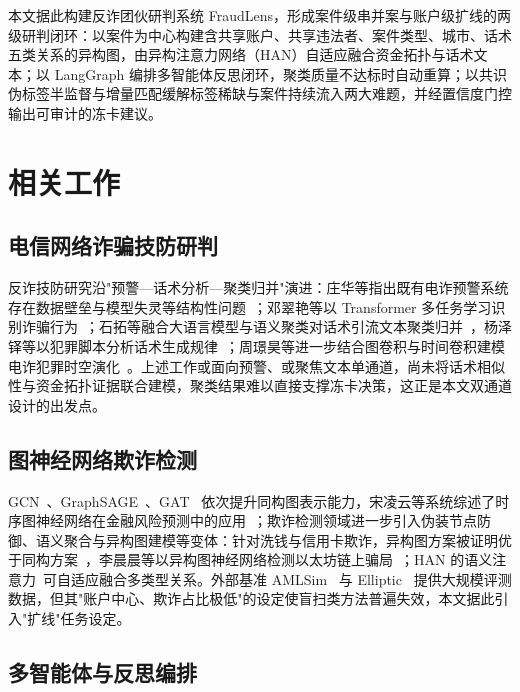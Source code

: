 \documentclass[12pt,a4paper,fontset=windows]{ctexart}
\begin{document}
本文据此构建反诈团伙研判系统 FraudLens，形成案件级串并案与账户级扩线的两级研判闭环：以案件为中心构建含共享账户、共享违法者、案件类型、城市、话术五类关系的异构图，由异构注意力网络（HAN）自适应融合资金拓扑与话术文本；以 LangGraph 编排多智能体反思闭环，聚类质量不达标时自动重算；以共识伪标签半监督与增量匹配缓解标签稀缺与案件持续流入两大难题，并经置信度门控输出可审计的冻卡建议。

\section{相关工作}

\subsection{电信网络诈骗技防研判}

反诈技防研究沿"预警—话术分析—聚类归并"演进：庄华等指出既有电诈预警系统存在数据壁垒与模型失灵等结构性问题~\cite{zhuang2025warning}；邓翠艳等以 Transformer 多任务学习识别诈骗行为~\cite{deng2024transformer}；石拓等融合大语言模型与语义聚类对话术引流文本聚类归并~\cite{shi2025llmsemantic}，杨泽铎等以犯罪脚本分析话术生成规律~\cite{yang2025crimescript}；周璟昊等进一步结合图卷积与时间卷积建模电诈犯罪时空演化~\cite{zhou2025spatiotemporal}。上述工作或面向预警、或聚焦文本单通道，尚未将话术相似性与资金拓扑证据联合建模，聚类结果难以直接支撑冻卡决策，这正是本文双通道设计的出发点。

\subsection{图神经网络欺诈检测}

GCN~\cite{kipf2017gcn}、GraphSAGE~\cite{hamilton2017graphsage}、GAT~\cite{velickovic2018gat} 依次提升同构图表示能力，宋凌云等系统综述了时序图神经网络在金融风险预测中的应用~\cite{song2024survey}；欺诈检测领域进一步引入伪装节点防御、语义聚合与异构图建模等变体：针对洗钱与信用卡欺诈，异构图方案被证明优于同构方案~\cite{wu2023moneylaunder}，李晨晨等以异构图神经网络检测以太坊链上骗局~\cite{li2025hnn4rp}；HAN 的语义注意力~\cite{wang2019han}可自适应融合多类型关系。外部基准 AMLSim~\cite{weber2018amlfirstlook} 与 Elliptic~\cite{weber2019elliptic} 提供大规模评测数据，但其"账户中心、欺诈占比极低"的设定使盲扫类方法普遍失效，本文据此引入"扩线"任务设定。

\subsection{多智能体与反思编排}
\end{document}
